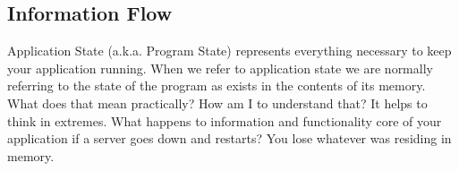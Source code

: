 \documentclass[12pt,twoside]{article}
\begin{document}
\subsection{Information Flow}
Application State (a.k.a. Program State) represents everything necessary to keep your application running.  When we refer to application state we are normally referring to the state of the program as exists in the contents of its memory.  What does that mean practically?  How am I to understand that?  It helps to think in extremes.  What happens to information and functionality core of your application if a server goes down and restarts?  You lose whatever was residing in memory.





\end{document}
